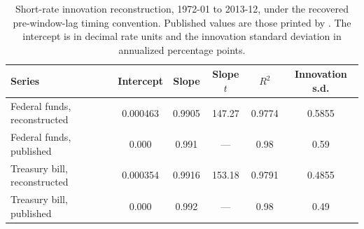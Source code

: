 \begin{table}[htbp]
\centering
\caption{Short-rate innovation reconstruction, 1972-01 to 2013-12, under the %
recovered pre-window-lag timing convention. Published values are those printed
by \citet{maio_santaclara_2017}. The intercept is in decimal rate units and the %
innovation standard deviation in annualized percentage points.}
\label{tab:ar1}
\begin{tabular}{lccccc}
\toprule
Series & Intercept & Slope & Slope $t$ & $R^2$ & Innovation s.d. \\ %
\midrule
Federal funds, reconstructed & 0.000463 & 0.9905 & 147.27 & 0.9774 & 0.5855 \\ %
Federal funds, published & 0.000 & 0.991 & --- & 0.98 & 0.59 \\ %
Treasury bill, reconstructed & 0.000354 & 0.9916 & 153.18 & 0.9791 & 0.4855 \\ %
Treasury bill, published & 0.000 & 0.992 & --- & 0.98 & 0.49 \\ %
\bottomrule
\end{tabular}
\end{table}
